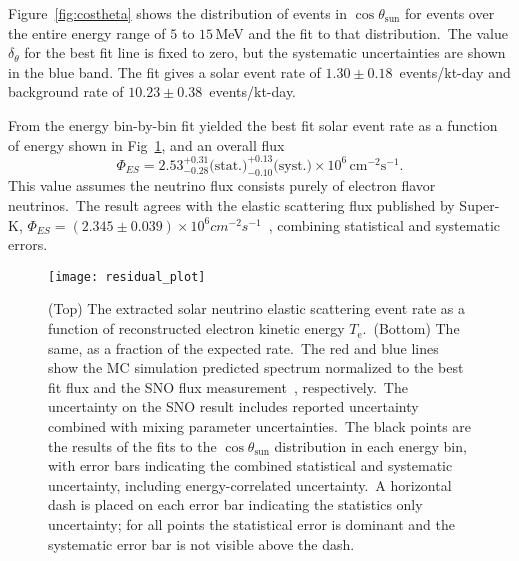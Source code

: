 Figure~\ref{fig:costheta} shows the distribution of events in $\cos\theta_\text{{sun}}$
for events over the entire energy range of $5$ to $15$\,MeV and the fit to that distribution.\
The value $\delta_\theta$ for the best fit line is fixed to zero, but the 
systematic uncertainties are shown in the blue band.
The fit gives a solar event rate of $1.30\pm0.18$~events/kt-day
 and background rate of  $10.23\pm0.38$~events/kt-day.

From the energy bin-by-bin fit  yielded the best fit solar event rate
as a function of energy shown in Fig~\ref{fig:spectrum}, and
an overall flux
\begin{equation*}
    \Phi_{ES}= 2.53^{+0.31}_{-0.28}\text{(stat.)}^{+0.13}_{-0.10}\text{(syst.)}\times10^6\,\text{cm}^{-2}\text{s}^{-1}\text{.}
\end{equation*}
This value assumes the neutrino flux consists purely of electron flavor neutrinos.\
The result agrees with the elastic scattering flux published by Super-K,
$\Phi_{ES}=\left(2.345\pm0.039\right)\times10^{6}cm^{-2}s^{-1}$~\citep{superk4},
combining statistical and systematic errors.

\begin{figure}
  \centering
  \texttt{[image: residual\_plot]}
  \caption[Solar Spectrum Data to MC Comparison]{
    (Top) The extracted solar neutrino elastic scattering event rate as a
    function of reconstructed electron kinetic energy $T_{\mathrm{e}}$.\
    (Bottom) The same, as a fraction of the expected rate.\
    The red and blue lines show the MC simulation predicted spectrum normalized
    to the best fit flux and the SNO flux measurement~\citep{sno_combined}, respectively.\
    The uncertainty on the SNO result includes reported uncertainty combined with
    mixing parameter uncertainties.\
    The black points are the results of the fits to the $\cos\theta_\text{{sun}}$
    distribution in each energy bin,
    with error bars indicating the combined statistical and systematic
    uncertainty, including energy-correlated uncertainty.\
    A horizontal dash is placed on each error bar indicating the statistics
    only uncertainty; for all points the statistical error is dominant and the systematic
    error bar is not visible above the dash.}
  \label{fig:spectrum}
\end{figure}

